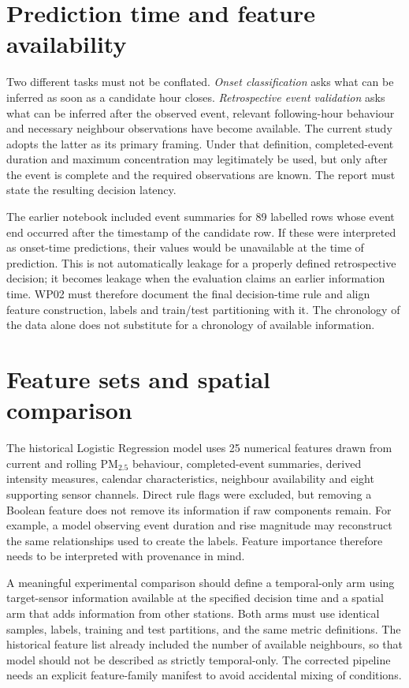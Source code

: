 \documentclass[12pt,a4paper,oneside]{report}
\begin{document}
\section{Prediction time and feature availability}
Two different tasks must not be conflated. \emph{Onset classification} asks what can be inferred as soon as a candidate hour closes. \emph{Retrospective event validation} asks what can be inferred after the observed event, relevant following-hour behaviour and necessary neighbour observations have become available. The current study adopts the latter as its primary framing. Under that definition, completed-event duration and maximum concentration may legitimately be used, but only after the event is complete and the required observations are known. The report must state the resulting decision latency.

The earlier notebook included event summaries for 89 labelled rows whose event end occurred after the timestamp of the candidate row. If these were interpreted as onset-time predictions, their values would be unavailable at the time of prediction. This is not automatically leakage for a properly defined retrospective decision; it becomes leakage when the evaluation claims an earlier information time. WP02 must therefore document the final decision-time rule and align feature construction, labels and train/test partitioning with it. The chronology of the data alone does not substitute for a chronology of available information.

\section{Feature sets and spatial comparison}
The historical Logistic Regression model uses 25 numerical features drawn from current and rolling PM$_{2.5}$ behaviour, completed-event summaries, derived intensity measures, calendar characteristics, neighbour availability and eight supporting sensor channels. Direct rule flags were excluded, but removing a Boolean feature does not remove its information if raw components remain. For example, a model observing event duration and rise magnitude may reconstruct the same relationships used to create the labels. Feature importance therefore needs to be interpreted with provenance in mind.

A meaningful experimental comparison should define a temporal-only arm using target-sensor information available at the specified decision time and a spatial arm that adds information from other stations. Both arms must use identical samples, labels, training and test partitions, and the same metric definitions. The historical feature list already included the number of available neighbours, so that model should not be described as strictly temporal-only. The corrected pipeline needs an explicit feature-family manifest to avoid accidental mixing of conditions.
\end{document}
